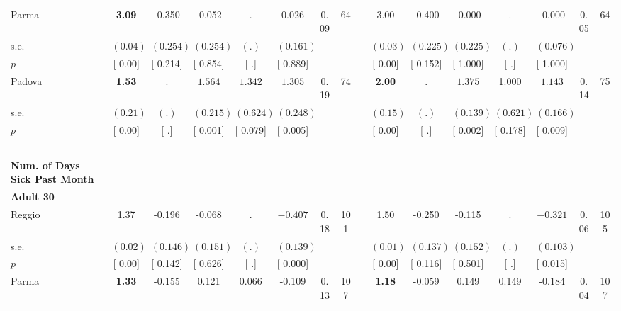 \begin{longtable}{L{8em} c c c c c c c p{1em} c c c c c c c}
\quad \quad \quad Parma& \textbf{     3.09} &    -0.350 &    -0.052 &         . &     0.026 &      0.09 &        64 & & 3.00 &    -0.400 &    -0.000 &         . &    -0.000 &      0.05 &        64  \\*
\quad \quad \quad \quad s.e.& $ (     0.04)$ & $ (    0.254)$ & $ (    0.254)$ & $ (        .)$ & $ (    0.161)$ & & & & $ (     0.03)$ & $ (    0.225)$ & $ (    0.225)$ & $ (        .)$ & $ (    0.076)$ & &  \\*
\quad \quad \quad \quad $ p$ & [     0.00] & [    0.214] & [    0.854] & [        .] & [    0.889] & & & & [     0.00] & [    0.152] & [    1.000] & [        .] & [    1.000] & &  \\[1em]
\quad \quad \quad Padova& \textbf{     1.53} &         . & $ \mathbf{    1.564}$ & $ \mathbf{    1.342}$ & $ \mathbf{    1.305}$ &      0.19 &        74 & & \textbf{     2.00} &         . & $ \mathbf{    1.375}$ &     1.000 & $ \mathbf{    1.143}$ &      0.14 &        75  \\*
\quad \quad \quad \quad s.e.& $ (     0.21)$ & $ (        .)$ & $ (    0.215)$ & $ (    0.624)$ & $ (    0.248)$ & & & & $ (     0.15)$ & $ (        .)$ & $ (    0.139)$ & $ (    0.621)$ & $ (    0.166)$ & &  \\*
\quad \quad \quad \quad $ p$ & [     0.00] & [        .] & [    0.001] & [    0.079] & [    0.005] & & & & [     0.00] & [        .] & [    0.002] & [    0.178] & [    0.009] & &  \\[1em]
~\\[1em]
\textbf{Num. of Days Sick Past Month} \\*
\quad \quad \textbf{Adult 30} & & & & & & & & & & & & & & & \\* 
\quad \quad \quad Reggio& 1.37 &    -0.196 &    -0.068 &         . & $ \mathbf{   -0.407}$ &      0.18 &       101 & & 1.50 &    -0.250 &    -0.115 &         . & $ \mathbf{   -0.321}$ &      0.06 &       105  \\*
\quad \quad \quad \quad s.e.& $ (     0.02)$ & $ (    0.146)$ & $ (    0.151)$ & $ (        .)$ & $ (    0.139)$ & & & & $ (     0.01)$ & $ (    0.137)$ & $ (    0.152)$ & $ (        .)$ & $ (    0.103)$ & &  \\*
\quad \quad \quad \quad $ p$ & [     0.00] & [    0.142] & [    0.626] & [        .] & [    0.000] & & & & [     0.00] & [    0.116] & [    0.501] & [        .] & [    0.015] & &  \\[1em]
\quad \quad \quad Parma& \textbf{     1.33} &    -0.155 &     0.121 &     0.066 &    -0.109 &      0.13 &       107 & & \textbf{     1.18} &    -0.059 &     0.149 &     0.149 &    -0.184 &      0.04 &       107  \\*

\end{longtable}
